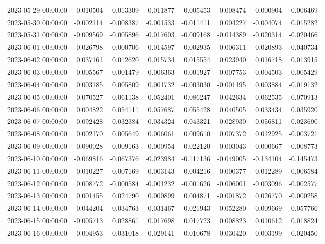 \begin{tabular}{lrrrrrrr}
2023-05-29 00:00:00 & -0.010504 & -0.013309 & -0.011877 & -0.005453 & -0.008474 & 0.000904 & -0.006469 \\
2023-05-30 00:00:00 & -0.002114 & -0.008387 & -0.001533 & -0.011411 & 0.004227 & -0.004074 & 0.015282 \\
2023-05-31 00:00:00 & -0.009569 & -0.005896 & -0.017603 & -0.009168 & -0.014389 & -0.020314 & -0.020466 \\
2023-06-01 00:00:00 & -0.026798 & 0.000706 & -0.014597 & -0.002935 & -0.006311 & -0.020893 & 0.040734 \\
2023-06-02 00:00:00 & 0.037161 & 0.012620 & 0.015734 & 0.015554 & 0.023940 & 0.016718 & 0.013915 \\
2023-06-03 00:00:00 & -0.005567 & 0.001479 & -0.006363 & 0.001927 & -0.007753 & -0.004503 & 0.005429 \\
2023-06-04 00:00:00 & 0.003185 & 0.005809 & 0.001732 & -0.003030 & -0.001195 & 0.003884 & -0.019132 \\
2023-06-05 00:00:00 & -0.070527 & -0.061138 & -0.052401 & -0.086247 & -0.042634 & -0.062535 & -0.070913 \\
2023-06-06 00:00:00 & 0.004822 & 0.054111 & 0.057687 & 0.055428 & 0.040505 & 0.033434 & 0.035920 \\
2023-06-07 00:00:00 & -0.092428 & -0.032384 & -0.034324 & -0.043321 & -0.028930 & -0.056811 & -0.023690 \\
2023-06-08 00:00:00 & 0.002170 & 0.005649 & 0.006061 & 0.009610 & 0.007372 & 0.012925 & -0.003721 \\
2023-06-09 00:00:00 & -0.090028 & -0.009163 & -0.000954 & 0.022120 & -0.003043 & -0.000667 & 0.008773 \\
2023-06-10 00:00:00 & -0.069816 & -0.067376 & -0.023984 & -0.117136 & -0.049005 & -0.134104 & -0.145473 \\
2023-06-11 00:00:00 & -0.010227 & -0.007169 & 0.003143 & -0.004216 & 0.000377 & -0.012289 & 0.006584 \\
2023-06-12 00:00:00 & 0.008772 & -0.000584 & -0.001232 & -0.001626 & -0.006001 & -0.003096 & -0.002577 \\
2023-06-13 00:00:00 & 0.001455 & 0.024790 & 0.000899 & 0.004871 & -0.001872 & 0.026770 & -0.000258 \\
2023-06-14 00:00:00 & -0.044204 & -0.034763 & -0.031467 & -0.021943 & -0.052280 & -0.009669 & -0.057766 \\
2023-06-15 00:00:00 & -0.005713 & 0.028861 & 0.017698 & 0.017723 & 0.008823 & 0.010612 & 0.018824 \\
2023-06-16 00:00:00 & 0.004953 & 0.031018 & 0.029141 & 0.010678 & 0.030420 & 0.003199 & 0.020450 \\

\end{tabular}
